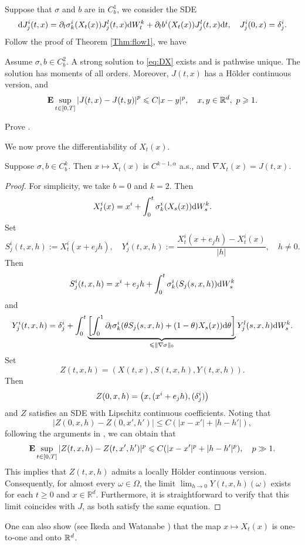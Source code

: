 Suppose that $\sigma$ and $b$ are in $C^1_b$, we consider the SDE 
\begin{equation}\label{eq:DX}
    \text{\rm{d}} J^i_j(t,x)=\partial_l\sigma^i_k(X_t(x)) J^l_j(t,x) \text{\rm{d}} W^k_t+\partial_l b^i(X_t(x)) J^l_j(t,x) \text{\rm{d}} t, \quad J^i_j(0,x)=\delta^i_j. 
\end{equation}
Follow the proof of Theorem \ref{Thm:flow1}, we have 
\begin{proposition}\label{Prop:J}
    Assume $\sigma, b\in C^2_b$. A strong solution to \eqref{eq:DX} exists and is pathwise unique. The solution has moments of all orders. Moreover, $J(t,x)$ has a Hölder continuous version, and 
    \[
        {\mathbf E} \sup_{t\in[0,T]}\left|J(t,x)-J(t,y)\right|^p\leqslant C |x-y|^p, \quad x,y\in {\mathbb R}^d,~p\geqslant 1.
    \]    
\end{proposition}
    
\begin{exercise}
    Prove . 
\end{exercise}

We now prove the differentiability of $X_t(x)$. 
\begin{theorem}
    Suppose  $\sigma,b\in C^k_b$. Then $x\mapsto X_t(x)$ is $C^{k-1,\alpha}$ a.s., and $\nabla X_t(x)=J(t,x)$. 
\end{theorem}
\begin{proof}
    For simplicity, we take $b=0$ and $k=2$. Then 
    \[
    X_t^i(x)=x^i+\int_0^t \sigma^i_k(X_s(x)) \text{\rm{d}} W^k_s. 
    \]
    Set 
    \[
        S^i_j(t,x,h):=X_t^i(x+e_jh), \quad Y^i_j(t,x,h):=\frac{X_t^i(x+e_jh)-X_t^i(x)}{|h|}, \quad h\neq 0. 
    \]
    Then 
    \[
    S_j^i(t,x,h)=x^i+e_j h + \int_0^t \sigma^i_k(S_j(s,x,h)) \text{\rm{d}} W^k_s
    \]
    and
    \[
     Y^i_j(t,x,h)=\delta^i_j+\int_0^t \underbrace{\left[\int_0^1 \partial_l\sigma^i_k(\theta S_j(s,x,h)+(1-\theta)X_s(x)) \text{\rm{d}} \theta\right]}_{\leqslant \|\nabla \sigma\|_0} Y_j^l(s,x,h) \text{\rm{d}} W_s^k. 
    \]
    Set 
    \[
        Z(t,x,h)=(X(t,x), S(t,x,h), Y(t,x,h)).
    \] 
    Then 
    \[
    Z(0,x,h)= \left(x,(x^i+e_jh), (\delta^i_j) \right)
    \]
    and \(Z\) satisfies an SDE with Lipschitz continuous coefficients. Noting that 
    \[
        |Z(0,x,h)-Z(0,x',h')|\leq C (|x-x'|+|h-h'|),
    \] 
    following the arguments in , we can obtain that 
    \[
    {\mathbf E} \sup_{t\in [0,T]}|Z(t,x,h)-Z(t,x',h')|^p  \leqslant C (|x-x'|^p+ |h-h'|^p), \quad p\gg 1. 
    \]
    This implies that \(Z(t, x, h)\) admits a locally Hölder continuous version. Consequently, for almost every \(\omega \in \Omega\), the limit \(\lim_{h \to 0} Y(t, x, h)(\omega)\) exists for each \(t \geq 0\) and \(x \in \mathbb{R}^d\). Furthermore, it is straightforward to verify that this limit coincides with \(J\), as both satisfy the same equation. 
\end{proof}
One can also show (see Ikeda and Watanabe \cite{ikeda2014stochastic}) that the map $x\mapsto X_t(x)$ is one-to-one and onto ${\mathbb R}^d$. 
